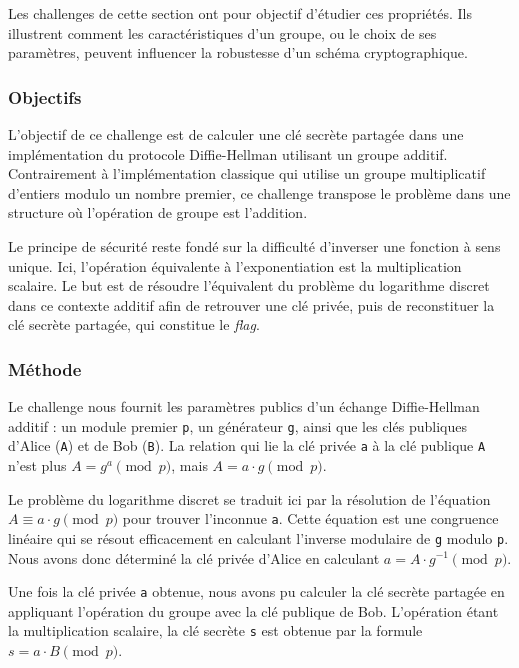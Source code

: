     Les challenges de cette section ont pour objectif d'étudier ces
    propriétés. Ils illustrent comment les caractéristiques d'un groupe, ou le
    choix de ses paramètres, peuvent influencer la robustesse d'un schéma
    cryptographique.

    \subsubsection{Objectifs}
    L'objectif de ce challenge est de calculer une clé secrète partagée dans une
    implémentation du protocole Diffie-Hellman utilisant un groupe additif.
    Contrairement à l'implémentation classique qui utilise un groupe
    multiplicatif d'entiers modulo un nombre premier, ce challenge transpose le
    problème dans une structure où l'opération de groupe est l'addition.

    Le principe de sécurité reste fondé sur la difficulté d'inverser une
    fonction à sens unique. Ici, l'opération équivalente à l'exponentiation est
    la multiplication scalaire. Le but est de résoudre l'équivalent du problème
    du logarithme discret dans ce contexte additif afin de retrouver une clé
    privée, puis de reconstituer la clé secrète partagée, qui constitue le
    \textit{flag}.

    \subsubsection{Méthode}
    Le challenge nous fournit les paramètres publics d'un échange
    Diffie-Hellman additif : un module premier \texttt{p}, un générateur
    \texttt{g}, ainsi que les clés publiques d'Alice (\texttt{A}) et de Bob
    (\texttt{B}). La relation qui lie la clé privée \texttt{a} à la clé
    publique \texttt{A} n'est plus $A = g^a \pmod{p}$, mais
    $A = a \cdot g \pmod{p}$.

    Le problème du logarithme discret se traduit ici par la résolution de
    l'équation $A \equiv a \cdot g \pmod{p}$ pour trouver l'inconnue
    \texttt{a}. Cette équation est une congruence linéaire qui se résout
    efficacement en calculant l'inverse modulaire de \texttt{g} modulo
    \texttt{p}. Nous avons donc déterminé la clé privée d'Alice en calculant
    $a = A \cdot g^{-1} \pmod{p}$.

    Une fois la clé privée \texttt{a} obtenue, nous avons pu calculer la clé
    secrète partagée en appliquant l'opération du groupe avec la clé publique
    de Bob. L'opération étant la multiplication scalaire, la clé secrète
    \texttt{s} est obtenue par la formule $s = a \cdot B \pmod{p}$.

